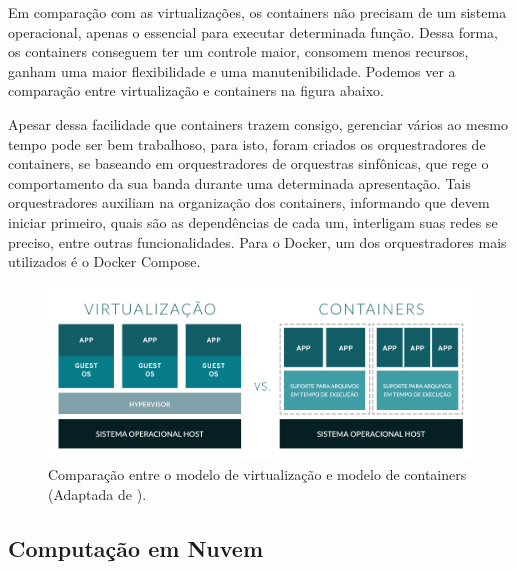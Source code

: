 Em comparação com as virtualizações, os containers não precisam de um sistema operacional, apenas o essencial para executar determinada função. Dessa forma, os containers conseguem ter um controle maior, consomem menos recursos, ganham uma maior flexibilidade e uma manutenibilidade. Podemos ver a comparação entre virtualização e containers na figura abaixo.

Apesar dessa facilidade que containers trazem consigo, gerenciar vários ao mesmo tempo pode ser bem trabalhoso, para isto, foram criados os orquestradores de containers, se baseando em orquestradores de orquestras sinfônicas, que rege o comportamento da sua banda durante uma determinada apresentação. Tais orquestradores auxiliam na organização dos containers, informando que devem iniciar primeiro, quais são as dependências de cada um, interligam suas redes se preciso, entre outras funcionalidades. Para o Docker, um dos orquestradores mais utilizados é o Docker Compose.

\begin{figure}[H]
  \centering
  \includegraphics[width=.80\textwidth]{assets/virtualization-vs-containers.png} 
  \caption{Comparação entre o modelo de virtualização e modelo de containers (Adaptada de \cite{redhat2020Containers}).}
  \label{fig:virtualization-vs-containers}
\end{figure}


\subsection{Computação em Nuvem}
\label{fund:nuvem}

